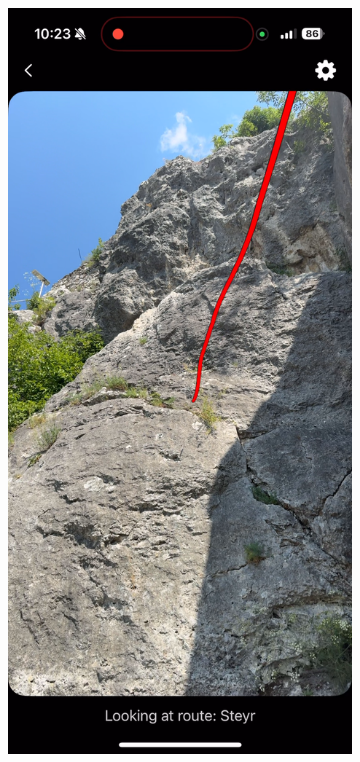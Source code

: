 \begin{figure}[H]
    \centering
    \begin{subfigure}[b]{0.45\textwidth}
        \centering
        \includegraphics[width=\textwidth]{images/testiranje/steyr_bad_detection_before_homography_fix.png}

\end{subfigure}
\end{figure}
